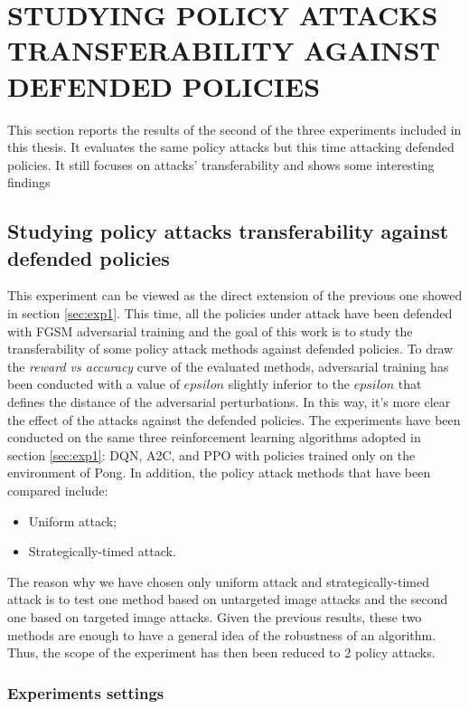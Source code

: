 \chapter{STUDYING POLICY ATTACKS TRANSFERABILITY AGAINST DEFENDED POLICIES}
\label{sec:exp2}

This section reports the results of the second of the three experiments included in this thesis. It evaluates the same policy attacks but this time attacking defended policies. It still focuses on attacks' transferability and shows some interesting findings

\section{Studying policy attacks transferability against defended policies}
This experiment can be viewed as the direct extension of the previous one showed in section \ref{sec:exp1}. This time, all the policies under attack have been defended with FGSM adversarial training and the goal of this work is to study the transferability of some policy attack methods against defended policies. To draw the {\it reward vs accuracy} curve of the evaluated methods, adversarial training has been conducted with a value of \(epsilon\) slightly inferior to the \(epsilon\) that defines the distance of the adversarial perturbations. In this way, it's more clear the effect of the attacks against the defended policies. The experiments have been conducted on the same three reinforcement learning algorithms adopted in section \ref{sec:exp1}: DQN, A2C, and PPO with policies trained only on the environment of Pong. In addition, the policy attack methods that have been compared include:
\begin{itemize}
    \item Uniform attack;
    \item Strategically-timed attack.
\end{itemize}
The reason why we have chosen only uniform attack and strategically-timed attack is to test one method based on untargeted image attacks and the second one based on targeted image attacks. Given the previous results, these two methods are enough to have a general idea of the robustness of an algorithm. Thus, the scope of the experiment has then been reduced to 2 policy attacks.

\subsection{Experiments settings}
